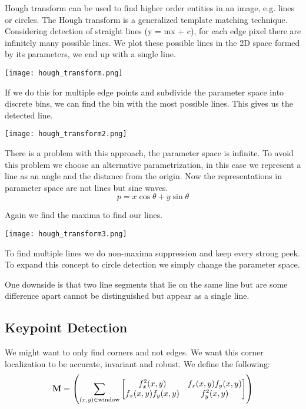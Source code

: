 Hough transform can be used to find higher order entities in an image, e.g. lines or circles. The Hough transform is a generalized template matching technique. Considering detection of straight lines (y = mx + c), for each edge pixel there are infinitely many possible lines. We plot these possible lines in the 2D space formed by its parameters, we end up with a single line.
\begin{center}
	\texttt{[image: hough\_transform.png]}
\end{center}

If we do this for multiple edge points and subdivide the parameter space into discrete bins, we can find the bin with the most possible lines. This gives us the detected line.
\begin{center}
	\texttt{[image: hough\_transform2.png]}
\end{center}

There is a problem with this approach, the parameter space is infinite. To avoid this problem we choose an alternative parametrization, in this case we represent a line as an angle and the distance from the origin. Now the representations in parameter space are not lines but sine waves.
$$p = x \cos \theta + y \sin \theta$$ 

Again we find the maxima to find our lines.
\begin{center}
	\texttt{[image: hough\_transform3.png]}
\end{center}

To find multiple lines we do non-maxima suppression and keep every strong peek. To expand this concept to circle detection we simply change the parameter space. \medskip

One downside is that two line segments that lie on the same line but are some difference apart cannot be distinguished but appear as a single line.


\subsection{Keypoint Detection}

We might want to only find corners and not edges. We want this corner localization to be accurate, invariant and robust. We define the following:
$$\textbf M = \left( \sum_{(x,y) \in \text{window}} 
\begin{bmatrix}
    f_x^2(x,y) & f_x(x,y) f_y(x,y) \\
    f_x(x,y) f_y(x,y) & f_y^2(x,y)
\end{bmatrix}
\right)$$

